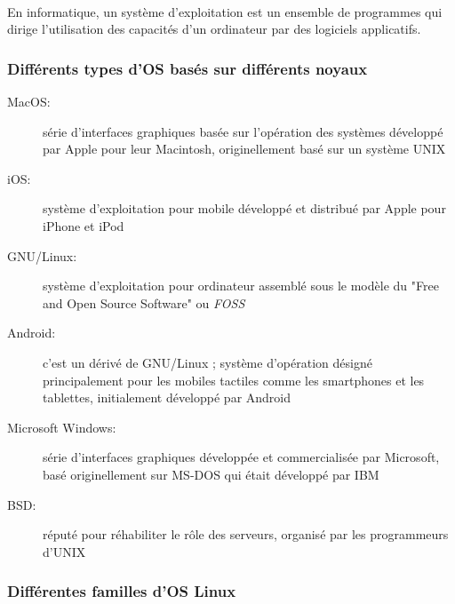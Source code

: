 \paragraph{} En informatique, un système d'exploitation est un ensemble de
programmes qui dirige l'utilisation des capacités d'un ordinateur par des
logiciels applicatifs.

\subsubsection{Différents types d'OS basés sur différents noyaux}

\begin{description}
	\item[MacOS:] série d'interfaces graphiques basée sur l'opération des
		systèmes développé par Apple pour leur Macintosh, originellement basé
		sur un système UNIX
	\item[iOS:] système d'exploitation pour mobile développé et distribué par
		Apple pour iPhone et iPod
	\item[GNU/Linux:] système d'exploitation pour ordinateur
		assemblé sous le modèle du "Free and Open Source Software" ou
		\textit{FOSS}
	\item[Android:] c'est un dérivé de GNU/Linux ; système d'opération désigné
		principalement pour les mobiles tactiles comme les smartphones
		et les tablettes, initialement développé par Android
	\item[Microsoft Windows:] série d'interfaces graphiques développée et
		commercialisée par Microsoft, basé originellement sur MS-DOS qui était
		développé par IBM
	\item[BSD:] réputé pour réhabiliter le rôle des serveurs, organisé par
		les programmeurs d'UNIX
\end{description}


\subsubsection{Différentes familles d'OS Linux}

